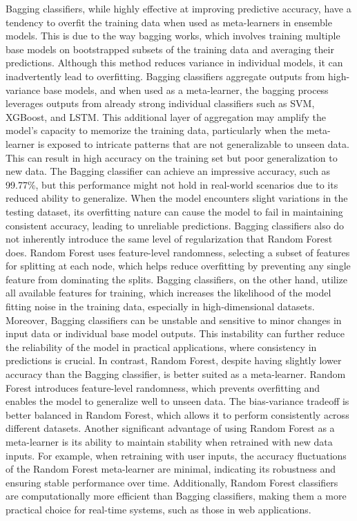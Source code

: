 \noindent
Bagging classifiers, while highly effective at improving predictive accuracy, have a tendency to overfit the training data when used as meta-learners in ensemble models. This is due to the way bagging works, which involves training multiple base models on bootstrapped subsets of the training data and averaging their predictions. Although this method reduces variance in individual models, it can inadvertently lead to overfitting. Bagging classifiers aggregate outputs from high-variance base models, and when used as a meta-learner, the bagging process leverages outputs from already strong individual classifiers such as SVM, XGBoost, and LSTM. This additional layer of aggregation may amplify the model's capacity to memorize the training data, particularly when the meta-learner is exposed to intricate patterns that are not generalizable to unseen data. This can result in high accuracy on the training set but poor generalization to new data. The Bagging classifier can achieve an impressive accuracy, such as 99.77\%, but this performance might not hold in real-world scenarios due to its reduced ability to generalize. When the model encounters slight variations in the testing dataset, its overfitting nature can cause the model to fail in maintaining consistent accuracy, leading to unreliable predictions. Bagging classifiers also do not inherently introduce the same level of regularization that Random Forest does. Random Forest uses feature-level randomness, selecting a subset of features for splitting at each node, which helps reduce overfitting by preventing any single feature from dominating the splits. Bagging classifiers, on the other hand, utilize all available features for training, which increases the likelihood of the model fitting noise in the training data, especially in high-dimensional datasets. Moreover, Bagging classifiers can be unstable and sensitive to minor changes in input data or individual base model outputs. This instability can further reduce the reliability of the model in practical applications, where consistency in predictions is crucial. In contrast, Random Forest, despite having slightly lower accuracy than the Bagging classifier, is better suited as a meta-learner. Random Forest introduces feature-level randomness, which prevents overfitting and enables the model to generalize well to unseen data. The bias-variance tradeoff is better balanced in Random Forest, which allows it to perform consistently across different datasets. Another significant advantage of using Random Forest as a meta-learner is its ability to maintain stability when retrained with new data inputs. For example, when retraining with user inputs, the accuracy fluctuations of the Random Forest meta-learner are minimal, indicating its robustness and ensuring stable performance over time. Additionally, Random Forest classifiers are computationally more efficient than Bagging classifiers, making them a more practical choice for real-time systems, such as those in web applications.


